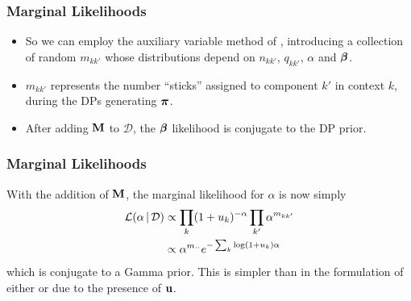 \documentclass[11pt, serif, mathserif, table,trans]{beamer}
\begin{document}
\begin{frame}
  \frametitle{Marginal Likelihoods}
  \begin{itemize}
  \item So we can employ the auxiliary variable method of
    \cite{escobar1995bayesian}, introducing a collection of
    random $m_{kk'}$ whose distributions depend on $n_{kk'}$, $q_{kk'}$,
    $\alpha$ and $\boldsymbol{\beta}$.
  \item $m_{kk'}$ represents the number ``sticks''
    assigned to component $k'$ in context $k$, during the
    DPs generating $\boldsymbol{\pi}$.
  \item After adding $\mathbf{M}$ to $\mathcal{D}$, the $\boldsymbol{\beta}$ likelihood is conjugate to
    the DP prior.
\end{itemize}
\end{frame}
\begin{frame}
  \frametitle{Marginal Likelihoods}
  With the addition of $\mathbf{M}$, the marginal likelihood for $\alpha$ is
  now simply
  \begin{align}
    \label{eq:24}
    \mathcal{L}(\alpha \, \vert \, \mathcal{D}) &\propto \prod_{k} (1 +
    u_k)^{-\alpha} \prod_{k'} \alpha^{m_{kk'}} \\
    &\propto \alpha^{m_{\cdot\cdot}} e^{-\sum_k \log(1 + u_k) \alpha}
  \end{align}
  which is conjugate to a Gamma prior.  This is simpler than in the
  formulation of either \cite{escobar1995bayesian} or
  \cite{teh2006hierarchical} due to the presence of $\mathbf{u}$.
\end{frame}
\end{document}
